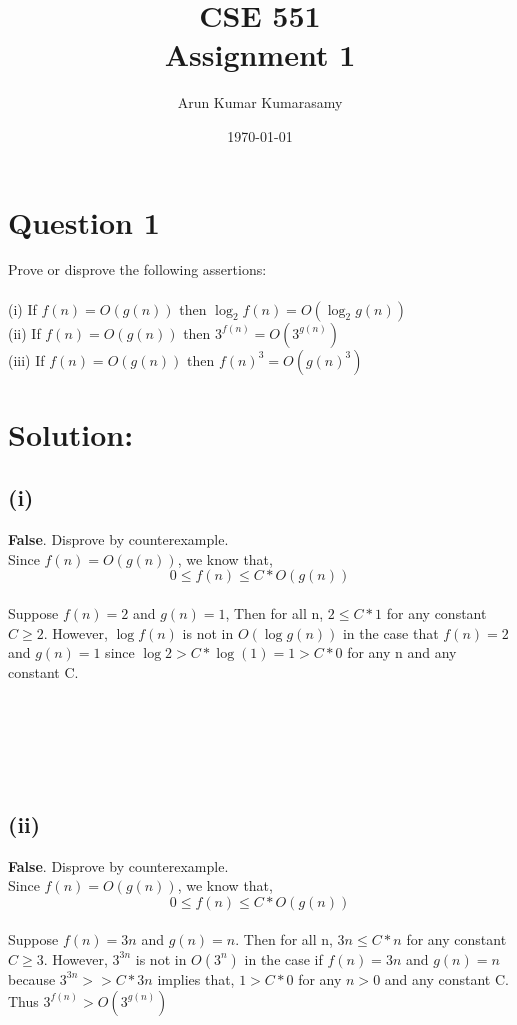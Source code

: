 \documentclass[12pt, a4paper]{article}
\begin{document}
\title {\textbf {CSE 551
\\Assignment 1}}
\author {Arun Kumar Kumarasamy}
\date{\today}
\maketitle

\section*{Question 1}
 Prove or disprove the following assertions:\\ 
\\(i) If $f(n) =O(g(n))$ then $\log_2 f(n) =O(\log_2 g(n))$
\\(ii) If $f(n) =O(g(n))$ then $3^{f(n)}=O(3^{g(n)})$
\\(iii) If $f(n) =O(g(n))$ then $f(n)^{3}=O(g(n)^{3})$ 
\section*{Solution:}
\subsection*{(i)} \textbf{False}. Disprove by counterexample.
\\Since $f(n) = O(g(n))$, we know that, $$ 0 \leq  f(n) \leq C * O(g(n)) $$
\\Suppose $f(n) = 2$ and $g(n) = 1$, Then for all n,  $2 \leq C * 1$ for any constant $C \geq 2$. However, $\log f(n)$ is not in $O(\log g(n))$ in the case that $f(n) = 2$ and $ g(n) = 1$  since $ \log 2 > C * \log (1) = 1 > C * 0$ for any n and any constant C.\\\\\\\\\\\\
\subsection*{(ii)} \textbf{False}. Disprove by counterexample.
\\Since $f(n) = O(g(n))$, we know that, $$ 0 \leq  f(n) \leq C * O(g(n)) $$
\\Suppose $f(n) = 3n$ and $g(n) = n$. Then for all n, $3n \leq C * n$ for any constant $C \geq 3$. However, $3^{3n}$ is not in $O(3^{n})$ in the case if $f(n) = 3n$ and $g(n) =n$ because $3^{3n} >> C*3n$ implies that, $1>C*0$ for any $n>0$ and any constant C. Thus $3^{f(n)} > O(3^{g(n)})$
\end{document}
